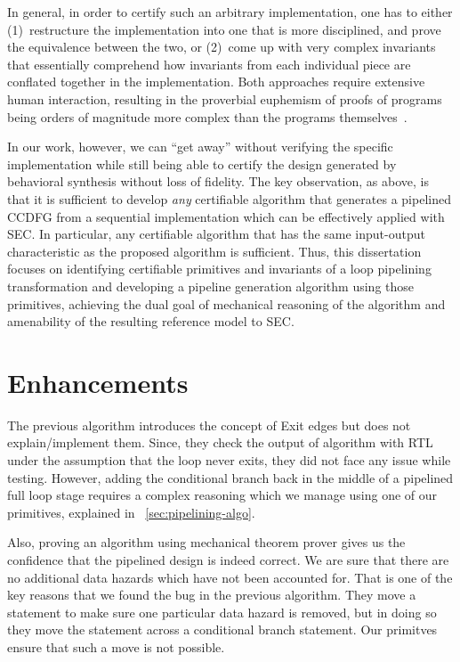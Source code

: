 In general, in order to certify such an arbitrary implementation,
one has to either (1)~restructure the implementation into
one that is more disciplined, and prove the equivalence
between the two, or (2)~come up with very complex
invariants that essentially comprehend how invariants from
each individual piece are conflated together in the
implementation.  Both approaches require extensive human
interaction, resulting in the proverbial euphemism of proofs
of programs being orders of magnitude more complex than the
programs themselves~\cite{liu}.

In our work, however, we can ``get away'' without verifying
the specific implementation while still being able to
certify the design generated by behavioral synthesis without
loss of fidelity. The key observation, as above, is that it
is sufficient to develop {\em any} certifiable algorithm
that generates a pipelined CCDFG from a sequential
implementation which can be effectively applied with SEC.
In particular, any certifiable algorithm that has the same
input-output characteristic as the proposed algorithm
is sufficient.  Thus, this dissertation focuses on identifying
certifiable primitives and invariants of a loop pipelining
transformation and developing a pipeline generation
algorithm using those primitives, achieving the dual goal of
mechanical reasoning of the algorithm and amenability of the
resulting reference model to SEC.

\section{Enhancements}
The previous algorithm introduces the concept of Exit edges but does not explain/implement them. Since, they check the output of algorithm with RTL under the assumption that the loop never exits, they did not face any issue while testing. However, adding the conditional branch back in the middle of a pipelined full loop stage requires a complex reasoning which we manage using one of our primitives, explained in ~\ref{sec:pipelining-algo}.

Also, proving an algorithm using mechanical theorem prover gives us the confidence that the pipelined design is indeed correct. We are sure that there are no additional data hazards which have not been accounted for. That is one of the key reasons that we found the bug in the previous algorithm. They move a statement to make sure one particular data hazard is removed, but in doing so they move the statement across a conditional branch statement. Our primitves ensure that such a move is not possible.    

